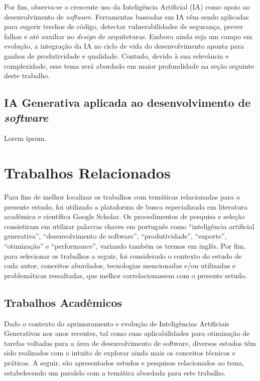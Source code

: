 \documentclass[english,brazilian]{UNISINOSartigo} %
\begin{document}
Por fim, observa-se o crescente uso da Inteligência Artificial (IA) como apoio ao desenvolvimento de \textit{software}. Ferramentas baseadas em IA vêm sendo aplicadas para sugerir trechos de código, detectar vulnerabilidades de segurança, prever falhas e até auxiliar no \textit{design} de arquiteturas. Embora ainda seja um campo em evolução, a integração da IA no ciclo de vida do desenvolvimento aponta para ganhos de produtividade e qualidade. Contudo, devido à sua relevância e complexidade, esse tema será abordado em maior profundidade na seção seguinte deste trabalho.

\subsection{IA Generativa aplicada ao desenvolvimento de \textit{software}}

Lorem ipsum.

\section{Trabalhos Relacionados}

Para fins de melhor localizar os trabalhos com temáticas relacionadas para o presente estudo, foi utilizado a plataforma de busca especializada em literatura acadêmica e científica Google Scholar. Os procedimentos de pesquisa e seleção consistiram em utilizar palavras chaves em português como “inteligência artificial generativa”, “desenvolvimento de software”, “produtividade”, “suporte”, “otimização” e “performance”, variando também os termos em inglês. Por fim, para selecionar os trabalhos a seguir, foi considerado o contexto do estudo de cada autor, conceitos abordados, tecnologias mencionadas e/ou utilizadas e problemáticas ressaltadas, que melhor correlacionassem com o presente estudo.

\subsection{Trabalhos Acadêmicos}

Dado o contexto do aprimoramento e evolução de Inteligências Artificiais Generativas nos anos recentes, tal como suas aplicabilidades para otimização de tarefas voltadas para a área de desenvolvimento de software, diversos estudos têm sido realizados com o intuito de explorar ainda mais os conceitos técnicos e práticos. A seguir, são apresentados estudos e pesquisas relacionados ao tema, estabelecendo um paralelo com a temática abordada para este trabalho.
\end{document}
